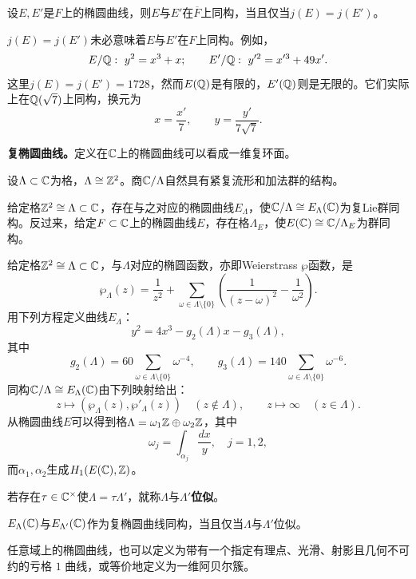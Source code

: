 \begin{theorem}\label{L7S1O2}
设$E,E'$是$F$上的椭圆曲线，则$E$与$E'$在$\overline F$上同构，当且仅当$j(E)=j(E')$。
\end{theorem}
\begin{note}[L7S1O3]
$j(E)=j(E')$未必意味着$E$与$E'$在$F$上同构。例如，
\[E/\Q:\ y^2=x^3+x;\qquad E'/\Q:\ y'^2=x'^3+49x'.\]
这里$j(E)=j(E')=1728$，然而$E(\mathbb{Q})$是有限的，$E'(\mathbb{Q})$则是无限的。它们实际上在$\mathbb{Q}(\sqrt7)$上同构，换元为
\[x=\frac{x'}7,\qquad y=\frac{y'}{7\sqrt7}.\]
\end{note}
\textbf{复椭圆曲线。}定义在$\mathbb{C}$上的椭圆曲线可以看成一维复环面。

设$\Lambda\subset\mathbb{C}$为格，$\Lambda\cong\mathbb{Z}^2$。商$\mathbb{C}/\Lambda$自然具有紧复流形和加法群的结构。
\begin{theorem}\label{L7S1O4}
给定格$\mathbb{Z}^2\cong\Lambda\subset\mathbb{C}$，存在与之对应的椭圆曲线$E_\Lambda$，使$\mathbb{C}/\Lambda\cong E_\Lambda(\mathbb{C})$为复Lie群同构。反过来，给定$F\subset\mathbb{C}$上的椭圆曲线$E$，存在格$\Lambda_E$，使$E(\mathbb{C})\cong\mathbb{C}/\Lambda_E$为群同构。
\end{theorem}
给定格$\mathbb{Z}^2\cong\Lambda\subset\mathbb{C}$，与$\Lambda$对应的椭圆函数，亦即Weierstrass $\wp$函数，是
\begin{equation}\tag{1.1}\label{L7eq11}
\wp_\Lambda(z)=\frac1{z^2}+\sum_{\omega\in\Lambda\setminus\{0\}}\left(\frac1{(z-\omega)^2}-\frac1{\omega^2}\right).
\end{equation}
用下列方程定义曲线$E_\Lambda$：
\[y^2=4x^3-g_2(\Lambda)x-g_3(\Lambda),\]
其中
\[g_2(\Lambda)=60\sum_{\omega\in\Lambda\setminus\{0\}}\omega^{-4},\qquad g_3(\Lambda)=140\sum_{\omega\in\Lambda\setminus\{0\}}\omega^{-6}.\]
同构$\mathbb{C}/\Lambda\cong E_\Lambda(\mathbb{C})$由下列映射给出：
\[z\longmapsto(\wp_\Lambda(z),\wp'_\Lambda(z))\quad(z\notin\Lambda),\qquad z\longmapsto\infty\quad(z\in\Lambda).\]
从椭圆曲线$E$可以得到格$\Lambda=\omega_1\mathbb{Z}\oplus\omega_2\mathbb{Z}$，其中
\[\omega_j=\int_{\alpha_j}\frac{dx}{y},\quad j=1,2,\]
而$\alpha_1,\alpha_2$生成$H_1(E(\mathbb{C}),\mathbb{Z})$。

若存在$\tau\in\mathbb{C}^\times$使$\Lambda=\tau\Lambda'$，就称$\Lambda$与$\Lambda'$\textbf{位似}。
\begin{theorem}\label{L7S1O5}
$E_\Lambda(\mathbb{C})$与$E_{\Lambda'}(\mathbb{C})$作为复椭圆曲线同构，当且仅当$\Lambda$与$\Lambda'$位似。
\end{theorem}
\begin{note}[L7S1O6]
任意域上的椭圆曲线，也可以定义为带有一个指定有理点、光滑、射影且几何不可约的亏格 $1$ 曲线，或等价地定义为一维阿贝尔簇。
\end{note}
